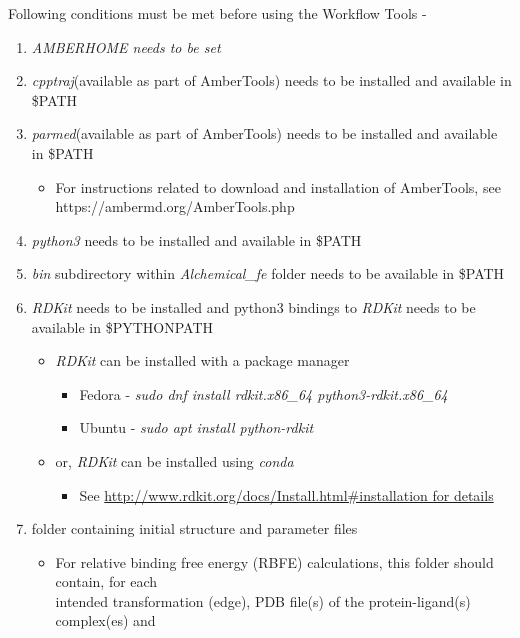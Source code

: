 \documentclass[11pt,letterpaper,titlepage]{article}
\begin{document}
Following conditions must be met before using the Workflow Tools -
\renewcommand{\labelenumi}{\Roman{enumi}}
\begin{enumerate}
	\item {\textit{AMBERHOME needs to be set}}
	\item{\textit{cpptraj}(available as part of AmberTools) needs to be installed and available in \$PATH}
	\item{\textit{parmed}(available as part of AmberTools) needs to be installed and available in \$PATH}
		\begin{itemize}
			\item For instructions related to download and installation of AmberTools, see \\
				https://ambermd.org/AmberTools.php
		\end{itemize}
	\item{\textit{python3} needs to be installed and available in \$PATH}
	\item{\textit{bin} subdirectory within \textit{Alchemical\_fe} folder needs to be available in \$PATH}
	\item{\textit{RDKit} needs to be installed and python3 bindings to \textit{RDKit} needs to be available in \$PYTHONPATH}
	\begin{itemize}
		\item{\textit{RDKit} can be installed with a package manager}
		\begin{itemize}
			\item{Fedora - \textit{sudo dnf install rdkit.x86\_64 python3-rdkit.x86\_64}}
			\item{Ubuntu - \textit{sudo apt install python-rdkit}}
		\end{itemize}
		\item{or, \textit{RDKit} can be installed using \textit{conda}}
		\begin{itemize}
			\item{See \url{http://www.rdkit.org/docs/Install.html\#installation for details}}
		\end{itemize}
	\end{itemize}
	\item{folder containing initial structure and parameter files}
		\begin{itemize}
			\item For relative binding free energy (RBFE) calculations, this folder should contain, for each \\
				intended transformation (edge), PDB file(s) of the protein-ligand(s) complex(es) and  \\

\end{itemize}
\end{enumerate}
\end{document}

